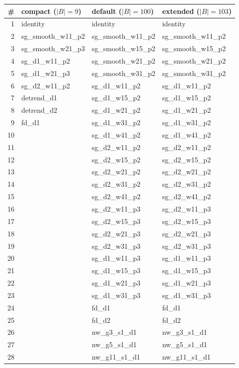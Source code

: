 \begin{tabular}{rlll}
\toprule
\# & compact ($|B|=9$) & default ($|B|=100$) & extended ($|B|=103$) \\
\midrule
1 & identity & identity & identity \\
2 & sg\_smooth\_w11\_p2 & sg\_smooth\_w11\_p2 & sg\_smooth\_w11\_p2 \\
3 & sg\_smooth\_w21\_p3 & sg\_smooth\_w15\_p2 & sg\_smooth\_w15\_p2 \\
4 & sg\_d1\_w11\_p2 & sg\_smooth\_w21\_p2 & sg\_smooth\_w21\_p2 \\
5 & sg\_d1\_w21\_p3 & sg\_smooth\_w31\_p2 & sg\_smooth\_w31\_p2 \\
6 & sg\_d2\_w11\_p2 & sg\_d1\_w11\_p2 & sg\_d1\_w11\_p2 \\
7 & detrend\_d1 & sg\_d1\_w15\_p2 & sg\_d1\_w15\_p2 \\
8 & detrend\_d2 & sg\_d1\_w21\_p2 & sg\_d1\_w21\_p2 \\
9 & fd\_d1 & sg\_d1\_w31\_p2 & sg\_d1\_w31\_p2 \\
10 &  & sg\_d1\_w41\_p2 & sg\_d1\_w41\_p2 \\
11 &  & sg\_d2\_w11\_p2 & sg\_d2\_w11\_p2 \\
12 &  & sg\_d2\_w15\_p2 & sg\_d2\_w15\_p2 \\
13 &  & sg\_d2\_w21\_p2 & sg\_d2\_w21\_p2 \\
14 &  & sg\_d2\_w31\_p2 & sg\_d2\_w31\_p2 \\
15 &  & sg\_d2\_w41\_p2 & sg\_d2\_w41\_p2 \\
16 &  & sg\_d2\_w11\_p3 & sg\_d2\_w11\_p3 \\
17 &  & sg\_d2\_w15\_p3 & sg\_d2\_w15\_p3 \\
18 &  & sg\_d2\_w21\_p3 & sg\_d2\_w21\_p3 \\
19 &  & sg\_d2\_w31\_p3 & sg\_d2\_w31\_p3 \\
20 &  & sg\_d1\_w11\_p3 & sg\_d1\_w11\_p3 \\
21 &  & sg\_d1\_w15\_p3 & sg\_d1\_w15\_p3 \\
22 &  & sg\_d1\_w21\_p3 & sg\_d1\_w21\_p3 \\
23 &  & sg\_d1\_w31\_p3 & sg\_d1\_w31\_p3 \\
24 &  & fd\_d1 & fd\_d1 \\
25 &  & fd\_d2 & fd\_d2 \\
26 &  & nw\_g3\_s1\_d1 & nw\_g3\_s1\_d1 \\
27 &  & nw\_g5\_s1\_d1 & nw\_g5\_s1\_d1 \\
28 &  & nw\_g11\_s1\_d1 & nw\_g11\_s1\_d1 \\

\end{tabular}
